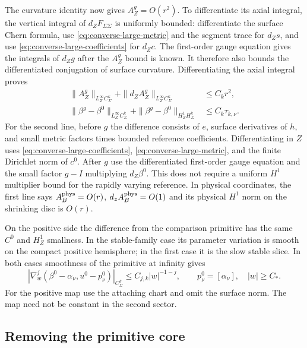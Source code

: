 \documentclass[11pt]{amsart}
\theoremstyle{definition}
\theoremstyle{remark}
\theoremstyle{plain}
\begin{document}
The curvature identity now gives $A_Z^g=O(r^2)$.
To differentiate its axial integral, the vertical integral of
$d_ZF_{\Sigma\Sigma}$ is uniformly bounded: differentiate the
surface Chern formula, use \eqref{eq:converse-large-metric}
and the segment trace for $d_Zs$, and use
\eqref{eq:converse-large-coefficients} for $d_Zc$.
The first-order gauge equation gives the integrals of $d_Zg$
after the $A_Z^g$ bound is known. It therefore also bounds
the differentiated conjugation of surface curvature.
Differentiating the axial integral proves
\begin{equation}\label{eq:converse-large-axial}
\begin{split}
 \|A_Z^g\|_{L_Z^\infty C_\Sigma^k}
       +\|d_ZA_Z^g\|_{L_Z^\infty C_\Sigma^k}&\leq C_kr^2,\\
 \|\beta^g-\beta^0\|_{L_Z^\infty C_\Sigma^k}
       +\|\beta^g-\beta^0\|_{H_Z^1H_\Sigma^k}
                                             &\leq C_k\tau_{k,\nu}.
\end{split}
\end{equation}
For the second line, before $g$ the difference consists of
$e$, surface derivatives of $h$, and small metric factors
times bounded reference coefficients. Differentiating in $Z$
uses \eqref{eq:converse-large-coefficients},
\eqref{eq:converse-large-metric}, and the finite Dirichlet norm
of $c^0$. After $g$ use the differentiated first-order gauge
equation and the small factor $g-I$ multiplying $d_Z\beta^0$.
This does not require a uniform $H^1$ multiplier bound for
the rapidly varying reference.
In physical coordinates, the first line says
$A_B^{\rm phys}=O(r)$, $d_zA_B^{\rm phys}=O(1)$ and its
physical $H^1$ norm on the shrinking disc is $O(r)$.

On the positive side the difference from the comparison primitive
has the same $C^0$ and $H_Z^1$ smallness. In the stable-family
case its parameter variation is smooth on the compact positive
hemisphere; in the first case it is the slow stable slice.
In both cases smoothness of the primitive at infinity gives
\begin{equation}\label{eq:converse-primitive-tail}
 |\nabla_w^j(\beta^0-\alpha_\nu,u^0-p_\nu^0)|_{C_\Sigma^k}
                   \leq C_{j,k}|w|^{-1-j},\qquad
 p_\nu^0=[\alpha_\nu],\quad |w|\geq C_*.
\end{equation}
For the positive map use the attaching chart and omit the
surface norm. The map need not be constant in the second sector.

\subsection{Removing the primitive core}
\end{document}
